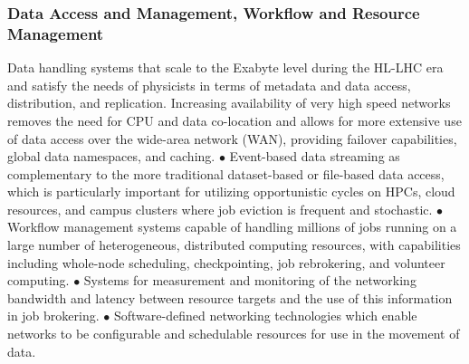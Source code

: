 \begin{frame}
\frametitle{Data Access and Management, Workflow and
Resource Management}
\scriptsize{ 
Data handling systems that scale to the Exabyte level during the
HL-LHC era and satisfy the needs of physicists in terms of metadata
and data access, distribution, and replication. Increasing
availability of very high speed networks removes the need for CPU
and data co-location and allows for more extensive use of data
access over the wide-area network (WAN), providing failover
capabilities, global data namespaces, and caching. $\bullet$ Event-based data
streaming as complementary to the more traditional dataset-based or
file-based data access, which is particularly important for
utilizing opportunistic cycles on HPCs, cloud resources, and campus
clusters where job eviction is frequent and stochastic. $\bullet$ Workflow
management systems capable of handling millions of jobs running on a
large number of heterogeneous, distributed computing resources, with
capabilities including whole-node scheduling, checkpointing, job
rebrokering, and volunteer computing. $\bullet$ Systems for measurement and
monitoring of the networking bandwidth and latency between resource
targets and the use of this information in job
brokering. $\bullet$ Software-defined networking technologies which enable
networks to be configurable and schedulable resources for use in the
movement of data.
}

\end{frame}


